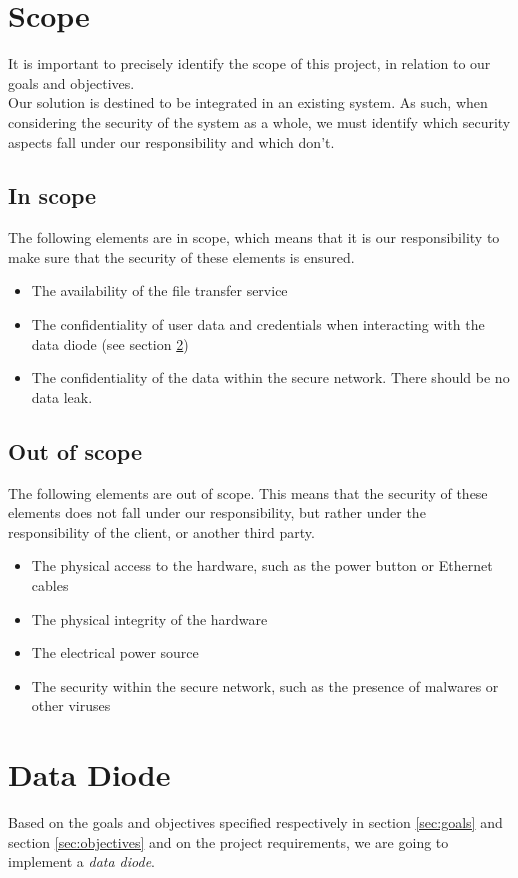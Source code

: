 \documentclass[a4paper,11pt]{article}
\begin{document}
\section{Scope}
It is important to precisely identify the scope of this project, in relation to our goals and objectives.\\

Our solution is destined to be integrated in an existing system. As such, when considering the security of the system as a whole, we must identify which security aspects fall under our responsibility and which don't. 

\subsection{In scope}
The following elements are in scope, which means that it is our responsibility to make sure that the security of these elements is ensured.

\begin{itemize}
\item{The availability of the file transfer service}
\item{The confidentiality of user data and credentials when interacting with the data diode (see section \ref{sec:data-diode})}
\item{The confidentiality of the data within the secure network. There should be no data leak.}
\end{itemize}

\subsection{Out of scope}
The following elements are out of scope. This means that the security of these elements does not fall under our responsibility, but rather under the responsibility of the client, or another third party.

\begin{itemize}
\item{The physical access to the hardware, such as the power button or Ethernet cables}
\item{The physical integrity of the hardware}
\item{The electrical power source}
\item{The security within the secure network, such as the presence of malwares or other viruses}
\end{itemize}


\section{Data Diode}
\label{sec:data-diode}
Based on the goals and objectives specified respectively in section \ref{sec:goals} and section \ref{sec:objectives} and on the project requirements, we are going to implement a \textit{data diode}.\\
\end{document}
